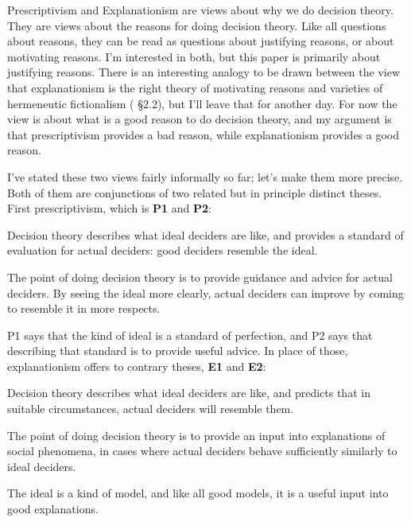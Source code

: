 \documentclass[
  11pt,
  letterpaper,
  DIV=11,
  numbers=noendperiod,
  twoside]{scrartcl}
\providecommand{\tightlist}{%
  \setlength{\itemsep}{0pt}\setlength{\parskip}{0pt}}\usepackage{longtable,booktabs,array}
\begin{document}
Prescriptivism and Explanationism are views about why we do decision
theory. They are views about the reasons for doing decision theory. Like
all questions about reasons, they can be read as questions about
justifying reasons, or about motivating reasons. I'm interested in both,
but this paper is primarily about justifying reasons. There is an
interesting analogy to be drawn between the view that explanationism is
the right theory of motivating reasons and varieties of hermeneutic
fictionalism ( §2.2), but I'll
leave that for another day. For now the view is about what is a good
reason to do decision theory, and my argument is that prescriptivism
provides a bad reason, while explanationism provides a good reason.

I've stated these two views fairly informally so far; let's make them
more precise. Both of them are conjunctions of two related but in
principle distinct theses. First prescriptivism, which is \textbf{P1}
and \textbf{P2}:

\begin{description}
\tightlist
\item[P1]
Decision theory describes what ideal deciders are like, and provides a
standard of evaluation for actual deciders: good deciders resemble the
ideal.
\item[P2]
The point of doing decision theory is to provide guidance and advice for
actual deciders. By seeing the ideal more clearly, actual deciders can
improve by coming to resemble it in more respects.
\end{description}

P1 says that the kind of ideal is a standard of perfection, and P2 says
that describing that standard is to provide useful advice. In place of
those, explanationism offers to contrary theses, \textbf{E1} and
\textbf{E2}:

\begin{description}
\tightlist
\item[E1]
Decision theory describes what ideal deciders are like, and predicts
that in suitable circumstances, actual deciders will resemble them.
\item[E2]
The point of doing decision theory is to provide an input into
explanations of social phenomena, in cases where actual deciders behave
sufficiently similarly to ideal deciders.
\end{description}

The ideal is a kind of model, and like all good models, it is a useful
input into good explanations.
\end{document}
